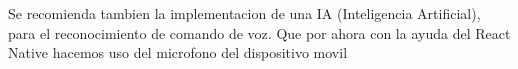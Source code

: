 \documentclass[letterpaper,12pt]{article}
\begin{document}
{		Se recomienda tambien la implementacion de una IA (Inteligencia Artificial), para el reconocimiento de comando de voz. 
		Que por ahora con la ayuda del React Native hacemos uso del microfono del dispositivo movil
		
		
		
		
		
		
		
		
		
		
}
\end{document}
